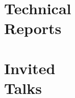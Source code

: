 \documentclass[margin,line]{resume}
\begin{document}
\begin{resume}
    \section{\mysidestyle Technical\\Reports}
    \begin{bibenum}
       \item {}
    \end{bibenum}
         
    \section{\mysidestyle Invited\\Talks}
    

\end{resume}
\end{document}
